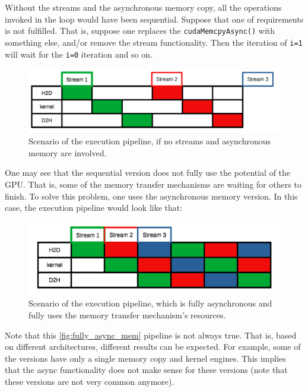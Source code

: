 Without the streams and the asynchronous memory copy, all the operations invoked in the loop would have been sequential. Suppose 
that one of requirements is not fulfilled. That is, suppose one replaces the \verb|cudaMemcpyAsync()| with something else, and/or remove the stream functionality.
Then the iteration of \verb|i=1| will wait for the \verb|i=0| iteration and so on.

\begin{figure}
  \centering 
  \includegraphics[scale=0.15]{pngs/asyncmem-page1.png}
  \caption{Scenario of the execution pipeline, if no streams and asynchronous memory are involved.}
\end{figure}

One may see that the sequential version does not fully use the potential of the GPU. That is, some of the memory 
transfer mechanisms are waiting for others to finish. To solve this problem, one uses the asynchronous memory version.
In this case, the execution pipeline would look like that:

\begin{figure}[ht!]
  \centering 
  \includegraphics[scale=0.15]{pngs/asyncmem-page2.png}
  \caption{Scenario of the execution pipeline, which is fully asynchronous and fully uses the memory transfer mechanism's resources.}
  \label{fig:fully_async_mem}
\end{figure}

Note that this \autoref{fig:fully_async_mem} pipeline is not always true. That is, based on different architectures, 
different results can be expected. For example, some of the versions have only a single memory copy and kernel engines. 
This implies that the async functionality does not make sense for these versions (note that these versions are not very common anymore).

